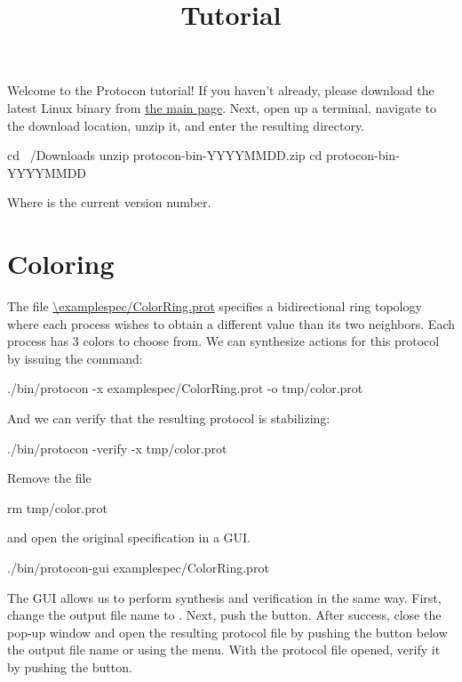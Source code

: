 
\title{Tutorial}
\date{}



Welcome to the Protocon tutorial!
If you haven't already, please download the latest Linux binary from \href{index.html}{the main page}.
Next, open up a terminal, navigate to the download location, unzip it, and enter the resulting directory.
\begin{code}
cd ~/Downloads
unzip protocon-bin-YYYYMMDD.zip
cd protocon-bin-YYYYMMDD
\end{code}
Where  is the current version number.



\section{Coloring}

The file \url{\examplespec/ColorRing.prot} specifies a bidirectional ring topology where each process wishes to obtain a different value than its two neighbors.
Each process has $3$ colors to choose from.
We can synthesize actions for this protocol by issuing the command:
\begin{code}
./bin/protocon -x examplespec/ColorRing.prot -o tmp/color.prot
\end{code}
And we can verify that the resulting protocol is stabilizing:
\begin{code}
./bin/protocon -verify -x tmp/color.prot
\end{code}

Remove the file
\begin{code}
rm tmp/color.prot
\end{code}
and open the original specification in a GUI.
\begin{code}
./bin/protocon-gui examplespec/ColorRing.prot
\end{code}

The GUI allows us to perform synthesis and verification in the same way.
First, change the output file name to .
Next, push the  button.
After success, close the pop-up window and open the resulting protocol file by pushing the  button below the output file name or using the  menu.
With the protocol file opened, verify it by pushing the  button.

